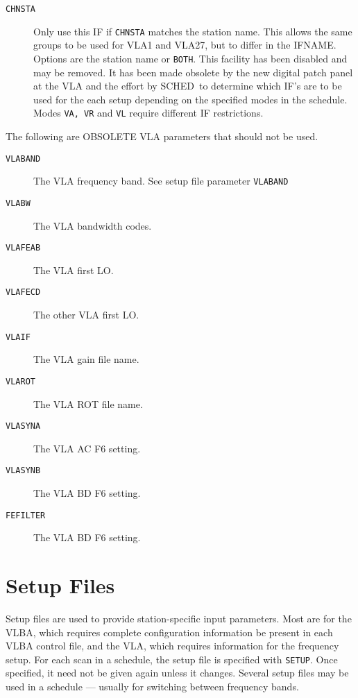 \documentclass{report}
\newcommand{\schedb}{{\sc SCHED~}}
\begin{document}
\begin{description}
\item [{\tt CHNSTA}]  Only use this IF if {\tt CHNSTA} matches the
station name.  This allows the same groups to be used for VLA1 and
VLA27, but to differ in the IFNAME.  Options are the station name
or {\tt BOTH}.  This facility has been disabled and may be removed.
It has been made obsolete by the new digital patch panel at the VLA
and the effort by \schedb to determine which IF's are to be used for
the each setup depending on the specified modes in the schedule.
Modes {\tt VA, VR} and {\tt VL} require different IF restrictions.

\end{description}

The following are OBSOLETE VLA parameters that should not be used.

\begin{description}

\item [{\tt VLABAND}] The VLA frequency band.  See setup file parameter
{\tt VLABAND}

\item [{\tt VLABW}] The VLA bandwidth codes.

\item [{\tt VLAFEAB}] The VLA first LO.

\item [{\tt VLAFECD}] The other VLA first LO.

\item [{\tt VLAIF}]  The VLA gain file name.

\item [{\tt VLAROT}] The VLA ROT file name.

\item [{\tt VLASYNA}] The VLA AC F6 setting.

\item [{\tt VLASYNB}] The VLA BD F6 setting.

\item [{\tt FEFILTER}] The VLA BD F6 setting.

\end{description}



\section{\label{SEC:SETUPS}Setup Files}

Setup files are used to provide station-specific input parameters.
Most are for the VLBA, which requires complete configuration
information be present in each VLBA control file, and the VLA, which
requires information for the frequency setup.  For each scan in a
schedule, the setup file is specified with {\tt SETUP}.  Once specified,
it need not be given again unless it changes.  Several setup files
may be used in a schedule --- usually for switching between frequency
bands.
\end{document}
